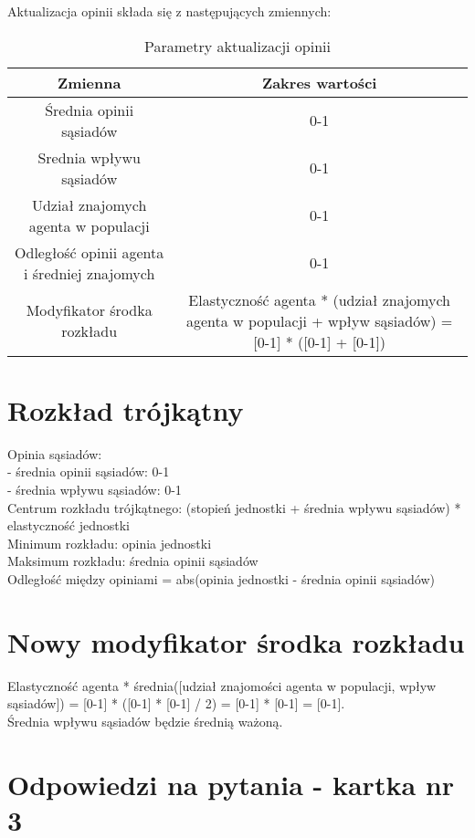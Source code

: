 \documentclass{wfiisul}
\begin{document}
Aktualizacja opinii składa się z następujących zmiennych:
\begin{table}[htbp]
  \centering
  \begin{tabular}{c|c}
    \hline
    Zmienna & Zakres wartości \\
    \hline
    Średnia opinii sąsiadów & 0-1 \\
    Srednia wpływu sąsiadów & 0-1 \\
    Udział znajomych agenta w populacji & 0-1 \\
    Odległość opinii agenta i średniej znajomych & 0-1 \\
    Modyfikator środka rozkładu & Elastyczność agenta * (udział znajomych agenta w populacji + wpływ sąsiadów) = [0-1] * ([0-1] + [0-1]) \\
  \end{tabular}
  \caption{Parametry aktualizacji opinii}
  \label{tab:opinion_update_parameters}
\end{table}

\section{Rozkład trójkątny}

Opinia sąsiadów: \\
- średnia opinii sąsiadów: 0-1 \\
- średnia wpływu sąsiadów: 0-1 \\

Centrum rozkładu trójkątnego: (stopień jednostki + średnia wpływu sąsiadów) * elastyczność jednostki \\
Minimum rozkładu: opinia jednostki \\
Maksimum rozkładu: średnia opinii sąsiadów \\
Odległość między opiniami = abs(opinia jednostki - średnia opinii sąsiadów) \\

\section{Nowy modyfikator środka rozkładu}

Elastyczność agenta * średnia([udział znajomości agenta w populacji, wpływ sąsiadów]) = [0-1] * ([0-1] * [0-1] / 2) = [0-1] * [0-1] = [0-1]. \\
Średnia wpływu sąsiadów będzie średnią ważoną. \\

\section{Odpowiedzi na pytania - kartka nr 3}
\end{document}
